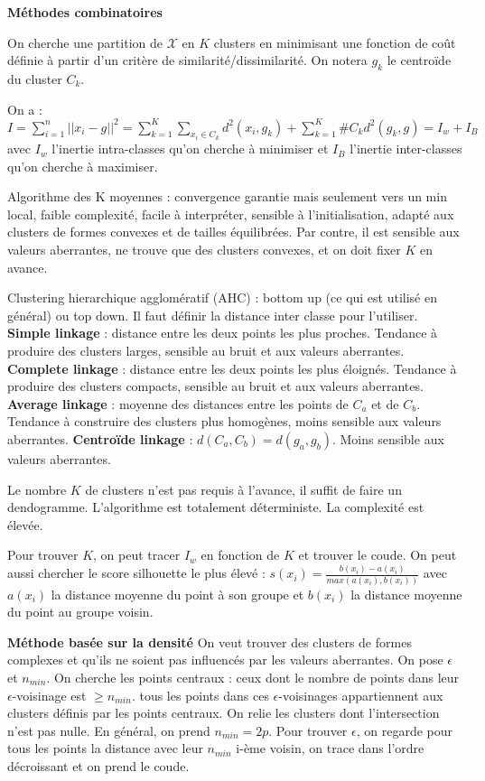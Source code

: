 \documentclass[5pt,a4paper]{article}
\begin{document}
\textbf{Méthodes combinatoires}

On cherche une partition de $\mathcal{X}$ en $K$ clusters en minimisant une fonction de coût définie à partir d'un critère de similarité/dissimilarité. On notera $g_k$ le centroïde du cluster $C_k$.

On a : $I = \sum_{i=1}^n||x_i-g||^2 = \sum_{k=1}^K \sum_{x_i \in C_k}d^2(x_i,g_k) + \sum_{k=1}^K \# C_k d^2(g_k,g) = I_w + I_B$ avec $I_w$ l'inertie intra-classes qu'on cherche à minimiser et $I_B$ l'inertie inter-classes qu'on cherche à maximiser.

Algorithme des K moyennes : convergence garantie mais seulement vers un min local, faible complexité, facile à interpréter, sensible à l'initialisation, adapté aux clusters de formes convexes et de tailles équilibrées. Par contre, il est sensible aux valeurs aberrantes, ne trouve que des clusters convexes, et on doit fixer $K$ en avance.

Clustering hierarchique agglomératif (AHC) : bottom up (ce qui est utilisé en général) ou top down. Il faut définir la distance inter classe pour l'utiliser.
\textbf{Simple linkage} : distance entre les deux points les plus proches. Tendance à produire des clusters larges, sensible au bruit et aux valeurs aberrantes.
\textbf{Complete linkage} : distance entre les deux points les plus éloignés. Tendance à produire des clusters compacts, sensible au bruit et aux valeurs aberrantes.
\textbf{Average linkage} : moyenne des distances entre les points de $C_a$ et de $C_b$. Tendance à construire des clusters plus homogènes, moins sensible aux valeurs aberrantes.
\textbf{Centroïde linkage} : $d(C_a,C_b) = d(g_a,g_b)$. Moins sensible aux valeurs aberrantes.

Le nombre $K$ de clusters n'est pas requis à l'avance, il suffit de faire un dendogramme. L'algorithme est totalement déterministe. La complexité est élevée.

Pour trouver $K$, on peut tracer $I_w$ en fonction de $K$ et trouver le coude. On peut aussi chercher le score silhouette le plus élevé : $s(x_i) = \frac{b(x_i)-a(x_i)}{max(a(x_i),b(x_i))}$ avec $a(x_i)$ la distance moyenne du point à son groupe et $b(x_i)$ la distance moyenne du point au groupe voisin.

\textbf{Méthode basée sur la densité}
On veut trouver des clusters de formes complexes et qu'ils ne soient pas influencés par les valeurs aberrantes. On pose $\epsilon$ et $n_{min}$. On cherche les points centraux : ceux dont le nombre de points dans leur $\epsilon$-voisinage est $\ge n_{min}$. tous les points dans ces $\epsilon$-voisinages appartiennent aux clusters définis par les points centraux. On relie les clusters dont l'intersection n'est pas nulle. En général, on prend $n_{min} = 2p$. Pour trouver $\epsilon$, on regarde pour tous les points la distance avec leur $n_{min}$ i-ème voisin, on trace dans l'ordre décroissant et on prend le coude.
\end{document}
